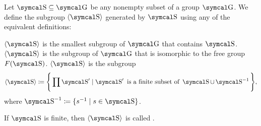 \begin{definition}\label{def:generated_subgroup}
  Let \( \CS \subseteq \CG \) be any nonempty subset of a group \( \CG \). We define the subgroup \( \Gen{\CS} \) generated by \( \CS \) using any of the equivalent definitions:
  \begin{DefEnum}
     \( \Gen{\CS} \) is the smallest subgroup of \( \CG \) that contains \( \CS \).
     \( \Gen{\CS} \) is the subgroup of \( \CG \) that is isomorphic to the free group \( F(\CS) \).
     \( \Gen{\CS} \) is the subgroup
    \begin{equation*}
      \Gen{\CS} \coloneqq \Bigg\{ \prod \CS' \mid \CS' \text{ is a finite subset of } \CS \cup \CS^{-1} \Bigg\},
    \end{equation*}
    where \( \CS^{-1} \coloneqq \{ s^{-1} \mid s \in \CS \} \).
  \end{DefEnum}

  If \( \CS \) is finite, then \( \Gen \CS \) is called .
\end{definition}
